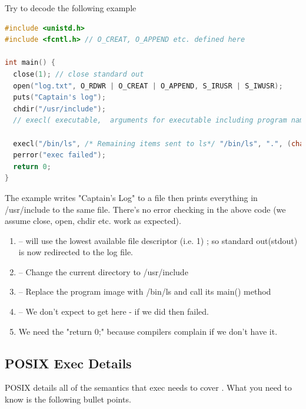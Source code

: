 Try to decode the following example

\begin{lstlisting}[language=C]
#include <unistd.h>
#include <fcntl.h> // O_CREAT, O_APPEND etc. defined here

int main() {
  close(1); // close standard out
  open("log.txt", O_RDWR | O_CREAT | O_APPEND, S_IRUSR | S_IWUSR);
  puts("Captain's log");
  chdir("/usr/include");
  // execl( executable,  arguments for executable including program name and NULL at the end)

  execl("/bin/ls", /* Remaining items sent to ls*/ "/bin/ls", ".", (char *) NULL); // "ls ."
  perror("exec failed");
  return 0;
}
\end{lstlisting}

The example writes "Captain's Log" to a file then prints everything in /usr/include to the same file.
There's no error checking in the above code (we assume close, open, chdir etc. work as expected).

\begin{enumerate}
    \item {} -- will use the lowest available file descriptor (i.e. 1) ; so standard out(stdout) is now redirected to the log file.
    \item {} -- Change the current directory to /usr/include
    \item {} -- Replace the program image with /bin/ls and call its main() method
    \item {} -- We don't expect to get here - if we did then  failed.
    \item We need the "return 0;" because compilers complain if we don't have it.
\end{enumerate}

\subsection{POSIX Exec Details}

POSIX details all of the semantics that exec needs to cover \cite{exec_2018}.
What you need to know is the following bullet points.

